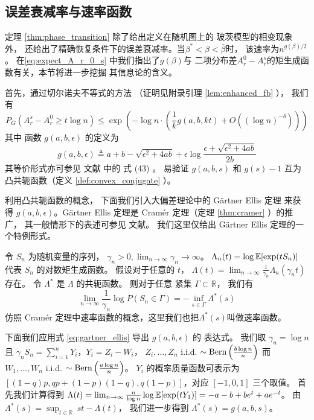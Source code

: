 \subsection{误差衰减率与速率函数}\label{sub:rate_function}
定理 \ref{thm:phase_transition} 除了给出定义在随机图上的
玻茨模型的相变现象外，
还给出了精确恢复条件下的误差衰减率。当$\beta^*<\beta<\bar{\beta}$时，
该速率为$n^{g(\beta)/2}$。
在\eqref{eq:expect_A_r_0_s} 中我们指出了$g(\beta)$与
二项分布差$A_r^0 - A_r^s$的矩生成函数有关，本节将进一步挖掘
其信息论的含义。

首先，通过切尔诺夫不等式的方法
（证明见附录引理 \ref{lem:enhanced_fb} ），
我们有
\begin{equation}\label{eq:introduction_g_a_b_eps}
  P_G(A_r^s - A_r^0 \ge t  \log n) 
	\le  \exp\left(-\log n \cdot
	\left(
   \frac{1}{k} g(a,b,kt) + O\left((\log n)^{-\delta} \right) \right)\right)
\end{equation}
其中 函数 $g(a,b,\epsilon)$ 的定义为
\begin{equation}  \label{equation:g}
  g(a,b,\epsilon) \triangleq a + b - \sqrt{\epsilon^2 + 4ab} + \epsilon \log \frac{\epsilon + \sqrt{\epsilon^2 + 4ab}}{2b}
\end{equation}
其等价形式亦可参见 文献 中的 式 (43)
。
易验证
$g(a,b,s)$ 和 $g(s)-1$ 互为凸共轭函数（定义 \ref{def:convex_conjugate} ）。

利用凸共轭函数的概念，
下面我们引入大偏差理论中的 Gärtner Ellis 定理
来获得 $g(a,b,\epsilon)$。Gärtner Ellis 定理是
Cramér 定理（定理 \ref{thm:cramer} ）的推广，
其一般情形下的表述可参见
文献。
我们这里仅给出 Gärtner Ellis 定理的一个特例形式。

令 $S_n$ 为随机变量的序列，
$\gamma_n >0, \lim_{n\to \infty}\gamma_n \to \infty$。
$\Lambda_n(t)=\log \operatorname{\mathbb{E}}[\exp(t S_n)]$ 代表 $S_n$ 的对数矩生成函数。
假设对于任意的 $t$，
$\Lambda(t) =\lim_{n\to \infty} \frac{1}{\gamma_n}\Lambda_n(\gamma_n t)$
存在。 令 $\Lambda^*$ 是 $\Lambda$ 的共轭函数。
则对于任意 紧集 $\Gamma \subset \mathbb{R}$，
我们有
\begin{equation}\label{eq:gartner_ellis}
\lim_{n\to \infty} \frac{1}{\gamma_n}\log P(S_n \in \Gamma) = -\inf_{s \in \Gamma} \Lambda^*(s)
\end{equation}
仿照 Cramér 定理中速率函数的概念，这里我们也把$\Lambda^*(s)$叫做速率函数。

下面我们应用式 \eqref{eq:gartner_ellis}
导出 $g(a,b,\epsilon)$ 的
表达式。
我们取 $\gamma_n= \log n$ 且 $\gamma_n S_n = \sum_{i=1}^n Y_i$，$Y_i=Z_i - W_i$，
$Z_i, \dots, Z_n$ i.i.d. $\sim\operatorname{Bern}\left(\frac{b \log n}{n}\right)$ 而 $W_1, \dots, W_n$  i.i.d. $\sim\operatorname{Bern}\left(\frac{a \log n}{n}\right)$。
$Y_i$ 的概率质量函数可表示为 $[(1-q)p, qp+(1-p)(1-q), q(1-p)]$，对应 $[-1,0,1]$ 三个取值。
首先我们计算得到 
$\Lambda(t) = \lim_{n\to \infty} \frac{n}{\log n} \log \operatorname{\mathbb{E}}[\exp(t Y_1)]
=-a-b+be^t  + ae^{-t}$。
由 $\Lambda^*(s) = \sup_{t\in\mathbb{R}}\ st - \Lambda(t)$，
我们进一步得到 $\Lambda^*(s) = g(a,b,s)$。

